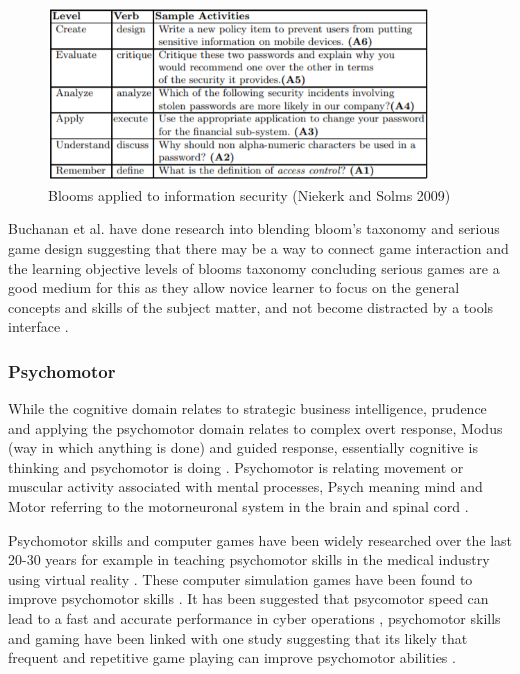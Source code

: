 \documentclass[12pt,a4paper]{article}
\begin{document}
\begin{figure}[h]
    \centering
    \includegraphics[width=0.9\textwidth]{Figs/blooms2.PNG} 
    \caption{Blooms applied to information security (Niekerk and Solms 2009)}
    \label{fig:fig3}
\end{figure} 

Buchanan et al. have done research into blending bloom's taxonomy and serious game design suggesting that there may be a way to connect game interaction and the learning objective levels of blooms taxonomy concluding serious games are a good medium for this as they allow novice learner to focus on the general concepts and skills of the subject matter, and not become distracted by a tools interface \cite{buchanan2011blending2}. 
\subsubsection{Psychomotor} 
While the cognitive domain relates to strategic business intelligence, prudence and applying the psychomotor domain relates to complex overt response, Modus (way in which anything is done) and guided response, essentially cognitive is thinking and psychomotor is doing \cite{schutte2016development}. Psychomotor is relating movement or muscular activity associated with mental processes, Psych meaning mind and Motor referring to the motorneuronal system in the brain and spinal cord \cite{tan2007psychomotor}. 
 
Psychomotor skills and computer games have been widely researched over the last 20-30 years for example in teaching psychomotor skills in the medical industry using virtual reality \cite{westwood1998validation} \cite{gallagher2001objective} \cite{gallagher2002virtual} \cite{grantcharov2004randomized} \cite{lehmann2005prospective}. These computer simulation games have been found to improve psychomotor skills \cite{mitchell2004use}. It has been suggested that psycomotor speed can lead to a fast and accurate performance in cyber operations \cite{campbell2015identifying}, psychomotor skills and gaming have been linked with one study suggesting that its likely that frequent and repetitive game playing can improve psychomotor abilities \cite{kennedy2011video}.
\end{document}
